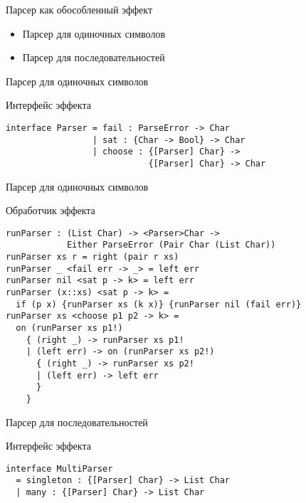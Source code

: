 \begin{frame}{Парсер как обособленный эффект}
  \begin{itemize}
    \item Парсер для одиночных символов
    \item Парсер для последовательностей
  \end{itemize}
\end{frame}

\begin{frame}[fragile]{Парсер для одиночных символов}
\begin{block}{Интерфейс эффекта}
\begin{verbatim}
interface Parser = fail : ParseError -> Char
                 | sat : {Char -> Bool} -> Char
                 | choose : {[Parser] Char} ->
                            {[Parser] Char} -> Char
\end{verbatim}
\end{block}
\end{frame}

\begin{frame}[fragile]{Парсер для одиночных символов}

\begin{block}{Обработчик эффекта}
\begin{verbatim}
runParser : (List Char) -> <Parser>Char ->
            Either ParseError (Pair Char (List Char))
runParser xs r = right (pair r xs)
runParser _ <fail err -> _> = left err
runParser nil <sat p -> k> = left err
runParser (x::xs) <sat p -> k> =
  if (p x) {runParser xs (k x)} {runParser nil (fail err)}
runParser xs <choose p1 p2 -> k> =
  on (runParser xs p1!)
    { (right _) -> runParser xs p1!
    | (left err) -> on (runParser xs p2!)
      { (right _) -> runParser xs p2!
      | (left err) -> left err
      }
    }
\end{verbatim}
\end{block}

\end{frame}

\begin{frame}[fragile]{Парсер для последовательностей}
\begin{block}{Интерфейс эффекта}
\begin{verbatim}
interface MultiParser
  = singleton : {[Parser] Char} -> List Char
  | many : {[Parser] Char} -> List Char
\end{verbatim}
\end{block}
\end{frame}

